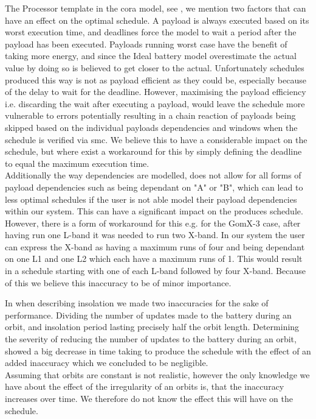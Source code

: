 The Processor template in the \gls{cora} model, see , we mention two factors that can have an effect on the optimal schedule. A payload is always executed based on its worst execution time, and deadlines force the model to wait a period after the payload has been executed. Payloads running worst case have the benefit of taking more energy, and since the Ideal battery model overestimate the actual value by doing so is believed to get closer to the actual. 
Unfortunately schedules produced this way is not as payload efficient as they could be, especially because of the delay to wait for the deadline. However, maximising the payload efficiency i.e. discarding the wait after executing a payload, would leave the schedule more vulnerable to errors potentially resulting in a chain reaction of payloads being skipped based on the individual payloads dependencies and windows when the schedule is verified via \gls{smc}. We believe this to have a considerable impact on the schedule, but where exist a workaround for this by simply defining the deadline to equal the maximum execution time.\\
Additionally the way dependencies are modelled, does not allow for all forms of payload dependencies such as being dependant on "A" or "B", which can lead to less optimal schedules if the user is not able model their payload dependencies within our system. This can have a significant impact on the produces schedule. However, there is a form of workaround for this e.g. for the GomX-3 case, after having run one L-band it was needed to run two X-band. In our system the user can express the X-band as having a maximum runs of four and being dependant on one L1 and one L2 which each have a maximum runs of 1. This would result in a schedule starting with one of each L-band followed by four X-band. Because of this we believe this inaccuracy to be of minor importance. 

In  when describing insolation we made two inaccuracies for the sake of performance. Dividing the number of updates made to the battery during an orbit, and insolation period lasting precisely half the orbit length. Determining the severity of reducing the number of updates to the battery during an orbit, showed a big decrease in time taking to produce the schedule with the effect of an added inaccuracy which we concluded to be negligible.\\
Assuming that orbits are constant is not realistic, however the only knowledge we have about the effect of the irregularity of an orbits is, that the inaccuracy increases over time. We therefore do not know the effect this will have on the schedule.

